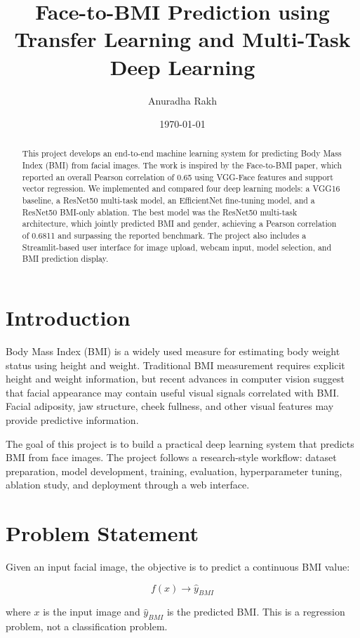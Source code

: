 \documentclass[11pt]{article}
\title{\textbf{Face-to-BMI Prediction using Transfer Learning and Multi-Task Deep Learning}}
\author{Anuradha Rakh}
\date{\today}
\begin{document}
\maketitle

\begin{abstract}
This project develops an end-to-end machine learning system for predicting Body Mass Index (BMI) from facial images. The work is inspired by the Face-to-BMI paper, which reported an overall Pearson correlation of 0.65 using VGG-Face features and support vector regression. We implemented and compared four deep learning models: a VGG16 baseline, a ResNet50 multi-task model, an EfficientNet fine-tuning model, and a ResNet50 BMI-only ablation. The best model was the ResNet50 multi-task architecture, which jointly predicted BMI and gender, achieving a Pearson correlation of 0.6811 and surpassing the reported benchmark. The project also includes a Streamlit-based user interface for image upload, webcam input, model selection, and BMI prediction display.
\end{abstract}

\section{Introduction}

Body Mass Index (BMI) is a widely used measure for estimating body weight status using height and weight. Traditional BMI measurement requires explicit height and weight information, but recent advances in computer vision suggest that facial appearance may contain useful visual signals correlated with BMI. Facial adiposity, jaw structure, cheek fullness, and other visual features may provide predictive information.

The goal of this project is to build a practical deep learning system that predicts BMI from face images. The project follows a research-style workflow: dataset preparation, model development, training, evaluation, hyperparameter tuning, ablation study, and deployment through a web interface.

\section{Problem Statement}

Given an input facial image, the objective is to predict a continuous BMI value:

\[
f(x) \rightarrow \hat{y}_{BMI}
\]

where \(x\) is the input image and \(\hat{y}_{BMI}\) is the predicted BMI. This is a regression problem, not a classification problem.
\end{document}
